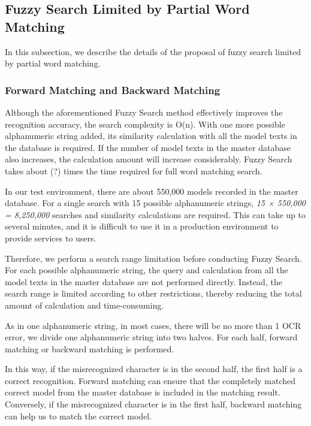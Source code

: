 \documentclass[technicalreport]{ieicej}
\begin{document}
    
    \subsection{Fuzzy Search Limited by Partial Word Matching}
        In this subsection, we describe the details of the proposal of fuzzy search limited by partial word matching.
        
        \subsubsection{Forward Matching and Backward Matching}
            Although the aforementioned Fuzzy Search method effectively improves the recognition accuracy, the search complexity is O(n). With one more possible alphanumeric string added, its similarity calculation with all the model texts in the database is required. If the number of model texts in the master database also increases, the calculation amount will increase considerably. Fuzzy Search takes about (?) times the time required for full word matching search.
            
            In our test environment, there are about 550,000 models recorded in the master database. For a single search with 15 possible alphanumeric strings, {\em 15 × 550,000 = 8,250,000} searches and similarity calculations are required. This can take up to several minutes, and it is difficult to use it in a production environment to provide services to users.
            
            Therefore, we perform a search range limitation before conducting Fuzzy Search. For each possible alphanumeric string, the query and calculation from all the model texts in the master database are not performed directly. Instead, the search range is limited according to other restrictions, thereby reducing the total amount of calculation and time-consuming.
            
            As in one alphanumeric string, in most cases, there will be no more than 1 OCR error, we divide one alphanumeric string into two halves. For each half, forward matching or backward matching is performed.
            
            In this way, if the misrecognized character is in the second half, the first half is a correct recognition. Forward matching can ensure that the completely matched correct model from the master database is included in the matching result. Conversely, if the misrecognized character is in the first half, backward matching can help us to match the correct model.
            
\end{document}
